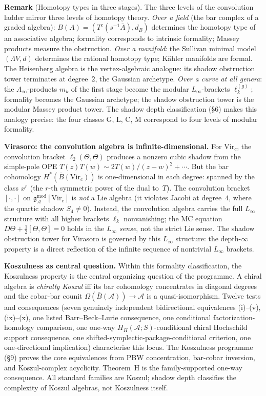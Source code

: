 \documentclass[11pt,reqno]{amsart}
\theoremstyle{definition}
\theoremstyle{remark}
\providecommand{\cA}{\mathcal{A}}
\providecommand{\barB}{\bar{B}}
\providecommand{\gAmod}{\mathfrak{g}^{\mathrm{mod}}_\cA}
\providecommand{\Vir}{\mathrm{Vir}}
\numberwithin{equation}{section}
\begin{document}
\medskip
\noindent\textbf{Remark} (Homotopy types in three stages). The three
levels of the convolution ladder mirror three levels of homotopy
theory. \emph{Over a field} (the bar complex of a graded algebra):
$B(A)=(T^c(s^{-1}\bar A),d_B)$ determines
the homotopy type of an associative algebra; formality corresponds to
intrinsic formality; Massey products measure the obstruction.
\emph{Over a manifold}: the Sullivan minimal model $(\Lambda V,d)$
determines the rational homotopy type; K\"ahler manifolds are formal.
The Heisenberg algebra is the vertex-algebraic analogue: its shadow
obstruction tower terminates at degree~$2$, the Gaussian archetype.
\emph{Over a curve at all genera}: the $A_\infty$-products $m_k$ of
the first stage become the modular $L_\infty$-brackets $\ell_k^{(g)}$;
formality becomes the Gaussian archetype; the shadow obstruction tower
is the modular Massey product tower. The shadow depth classification
(\S6) makes this analogy precise: the four classes G, L, C, M
correspond to four levels of modular formality.

\medskip
\noindent\textbf{Virasoro: the convolution algebra is infinite-dimensional.}\enspace
For $\Vir_c$, the convolution bracket
$\ell_2(\Theta,\Theta)$ produces a nonzero cubic shadow from the
simple-pole OPE $T(z)T(w)\sim 2T(w)/(z-w)^2+\cdots$. But the
bar cohomology $H^*(\barB(\Vir_c))$ is one-dimensional in each degree:
spanned by the class $x^r$ (the $r$-th symmetric power of the
dual to~$T$). The convolution bracket $[\cdot,\cdot]$ on
$\gAmod[\Vir_c]$ is \emph{not} a Lie algebra (it violates Jacobi at
degree~$4$, where the quartic shadow $S_4\neq 0$). Instead, the
convolution algebra carries the full $L_\infty$ structure with all
higher brackets $\ell_k$ nonvanishing; the MC equation
$D\Theta+\tfrac{1}{2}[\Theta,\Theta]=0$ holds in the
\emph{$L_\infty$ sense}, not the strict Lie sense. The shadow
obstruction tower for Virasoro is governed by this $L_\infty$
structure: the depth-$\infty$ property is a direct reflection of the
infinite sequence of nontrivial $L_\infty$ brackets.

\medskip
\noindent\textbf{Koszulness as central question.}\enspace
Within this formality classification, the Koszulness property is the
central organizing question of the programme. A chiral algebra is
\emph{chirally Koszul} iff its bar cohomology concentrates in
diagonal degrees and the cobar-bar counit
$\Omega(\barB(\cA))\to\cA$ is a quasi-isomorphism. Twelve tests and
consequences (seven genuinely independent bidirectional equivalences
\textup{(i)--(v), (ix)--(x)}, one listed Barr--Beck--Lurie
consequence, one conditional factorization-homology comparison, one
one-way $H_H(\cA;S)$-conditional chiral Hochschild support consequence, one
shifted-symplectic-package-conditional criterion, one one-directional
implication) characterise this locus. The Koszulness programme
(\S9) proves the core equivalences from PBW concentration, bar-cobar
inversion, and Koszul-complex acyclicity.  Theorem~H is the
family-supported one-way consequence. All standard families are Koszul; shadow depth classifies
the complexity of Koszul algebras, not Koszulness itself.
\end{document}
